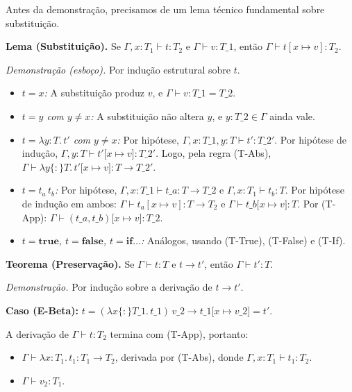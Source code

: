 Antes da demonstração, precisamos de um lema técnico fundamental
sobre substituição.

\textbf{Lema (Substituição).} Se \(\Gamma, x : T_1 \vdash t : T_2\) e
\(\Gamma \vdash v : T\_1\), então \(\Gamma
\vdash t[x \mapsto v] : T_2\).

\emph{Demonstração (esboço).} Por indução estrutural sobre \(t\).

\begin{itemize}
  \item
    \emph{\(t = x\):} A substituição produz \(v\), e
    \(\Gamma \vdash v : T\_1 = T\_2\).
  \item
    \emph{\(t = y\) com \(y \neq x\):} A substituição não altera
    \(y\), e \(y : T\_2 \in \Gamma\) ainda vale.
  \item
    \emph{\(t = \lambda y {:} T.\, t'\) com \(y \neq x\):} Por
    hipótese, \(\Gamma, x : T\_1, y : T \vdash t' :
    T\_2'\). Por hipótese de indução,
    \(\Gamma, y : T \vdash t'{[}x \mapsto v{]} :
    T\_2'\). Logo, pela regra (T-Abs),
    \(\Gamma \vdash \lambda y \{:\} T.\,
    t'{[}x \mapsto v{]} : T \to T\_2'\).
  \item
    \emph{\(t = t_a\, t_b\):} Por hipótese, \(\Gamma, x
    : T\_1 \vdash t\_a : T \to T\_2\) e \(\Gamma, x :
    T_1 \vdash t_b : T\). Por hipótese de indução em ambos: \(\Gamma
    \vdash t_a[x \mapsto v] : T \to T_2\) e \(\Gamma
    \vdash t\_b{[}x \mapsto v{]} : T\). Por (T-App):
    \(\Gamma \vdash (t\_a, t\_b){[}x \mapsto v{]} :
    T\_2\).
  \item
    \emph{\(t = \mathbf{true}\), \(t = \mathbf{false}\),
    \(t = \mathbf{if}\ldots\):} Análogos,
    usando (T-True), (T-False) e (T-If).
\end{itemize}

\textbf{Teorema (Preservação).} Se \(\Gamma \vdash t : T\) e \(t \to
t'\), então \(\Gamma \vdash t' : T\).

\emph{Demonstração.} Por indução sobre a derivação de \(t \to t'\).

\textbf{Caso (E-Beta):} \(t = (\lambda x \{:\}
  T\_1.\, t\_1)\, v\_2 \to t\_1{[}x \mapsto
v\_2{]} = t'\).

A derivação de \(\Gamma \vdash t : T_2\) termina com (T-App), portanto:

\begin{itemize}
  \item
    \(\Gamma \vdash \lambda x {:} T_1.\, t_1 : T_1 \to T_2\),
    derivada por (T-Abs), donde \(\Gamma, x : T_1 \vdash t_1 : T_2\).
  \item
    \(\Gamma \vdash v_2 : T_1\).
\end{itemize}

